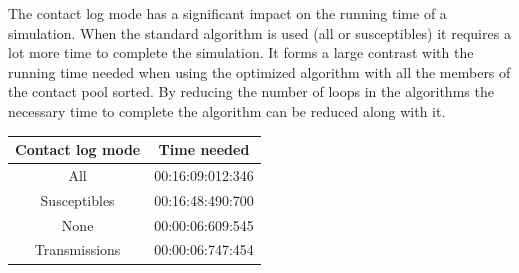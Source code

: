 \documentclass[runningheads]{llncs}
\begin{document}
The contact log mode has a significant impact on the running time of a simulation. When the standard algorithm is used (all or susceptibles) it requires a lot more time to complete the simulation. It forms a large contrast with the running time needed when using the optimized algorithm with all the members of the contact pool sorted. By reducing the number of loops in the algorithms the necessary time to complete the algorithm can be reduced along with it.
\begin{center}
	\begin{tabular}{ | c | c |}
		\hline
		Contact log mode & Time needed \\ \hline
		All & 00:16:09:012:346 \\ \hline
		Susceptibles & 00:16:48:490:700 \\ \hline
		None & 00:00:06:609:545 \\ \hline
		Transmissions & 00:00:06:747:454 \\
		\hline	
	\end{tabular}
\end{center}
\end{document}
